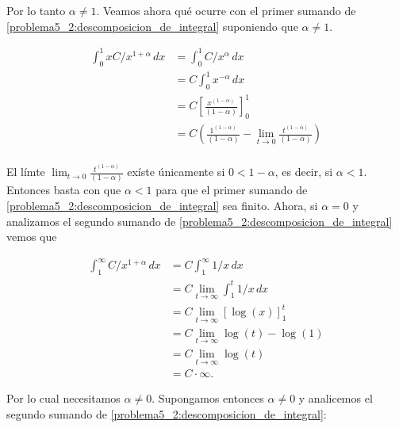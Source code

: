 Por lo tanto $\alpha \not= 1$. Veamos ahora qué ocurre con el primer sumando de \eqref{problema5_2:descomposicion_de_integral}
suponiendo que $\alpha \not= 1$.

\begin{align}
    \int_0^1 x C/x^{1+\alpha} \,dx  &=  \int_0^1 C/x^{\alpha}   \,dx                                                                                    \\
                                    &=  C \int_0^1 x^{-\alpha} \,dx                                                                                     \\
                                    &=  C \left[ \frac{x^{(1-\alpha)}}{(1-\alpha)}\right]_0^1                                                           \\
                                    &=  C \left( \frac{1^{(1-\alpha)}}{(1-\alpha)} - \lim_{t \rightarrow 0}\frac{t^{(1-\alpha)}}{(1-\alpha)}\right)     \\
\end{align}\pn

El límte $\lim_{t \rightarrow 0}\frac{t^{(1-\alpha)}}{(1-\alpha)}$ exíste únicamente si $0 < 1-\alpha$, es decir, si $\alpha < 1$. Entonces basta con 
que $\alpha < 1$ para que el primer sumando de \eqref{problema5_2:descomposicion_de_integral} sea finito. Ahora, si $\alpha = 0$ y analizamos el 
segundo sumando de \eqref{problema5_2:descomposicion_de_integral} vemos que

\begin{align}
    \int_1^\infty C/x^{1+\alpha} \,dx   &=  C \int_1^\infty 1/x \,dx                                            \\ 
                                        &=  C \lim_{t \rightarrow \infty} \int_1^t 1/x \,dx                     \\ 
                                        &=  C \lim_{t \rightarrow \infty} \left[ \log(x) \right]_1^t            \\ 
                                        &=  C \lim_{t \rightarrow \infty} \log(t) - \log(1)                     \\ 
                                        &=  C \lim_{t \rightarrow \infty} \log(t)                               \\ 
                                        &=  C \cdot \infty.                                                       
\end{align}

Por lo cual necesitamos $\alpha \not= 0$. Supongamos entonces $\alpha \not= 0$ y analicemos el segundo sumando de \eqref{problema5_2:descomposicion_de_integral}:

